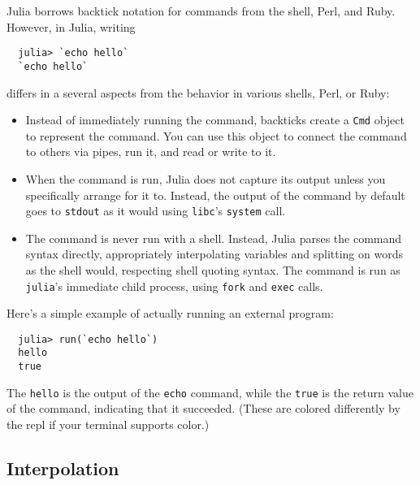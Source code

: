 \documentclass{article}
\begin{document}
Julia borrows backtick notation for commands from the shell, Perl, and Ruby.
However, in Julia, writing
\begin{verbatim}
  julia> `echo hello`
  `echo hello`
\end{verbatim}
differs in a several aspects from the behavior in various shells, Perl, or Ruby:
\begin{itemize}

\item Instead of immediately running the command, backticks create a \verb|Cmd| object to represent the command.
You can use this object to connect the command to others via pipes, run it, and read or write to it.

\item When the command is run, Julia does not capture its output unless you specifically arrange for it to.
Instead, the output of the command by default goes to \verb|stdout| as it would using \verb|libc|'s \verb|system| call.

\item The command is never run with a shell.
Instead, Julia parses the command syntax directly, appropriately interpolating variables and splitting on words as the shell would, respecting shell quoting syntax.
The command is run as \verb|julia|'s immediate child process, using \verb|fork| and \verb|exec| calls.

\end{itemize}
Here's a simple example of actually running an external program:
\begin{verbatim}
  julia> run(`echo hello`)
  hello
  true
\end{verbatim}
The \verb|hello| is the output of the \verb|echo| command, while the \verb|true| is the return value of the command, indicating that it succeeded.
(These are colored differently by the repl if your terminal supports color.)

\subsection{Interpolation}
\end{document}
